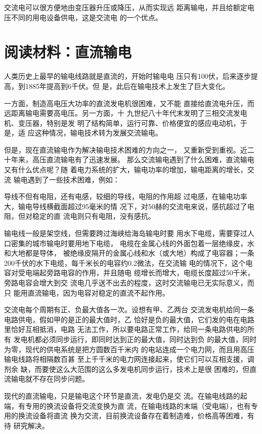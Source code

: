 交流电可以很方便地由变压器升压或降压，从而实现远
距离输电，并且给额定电压不同的用电设备供电，这是交流电
的一个优点。

\section*{阅读材料：直流输电}
人类历史上最早的输电线路就是直流的，开始时输电电
压只有100伏，后来逐步提高，到1885年提高到6千伏。但
是，此后在输电技术上发生了巨大变化。

一方面，制造高电压大功率的直流发电机很困难，又不能
直接给直流电升压，而远距离输电需要高电压。另一方面，十
九世纪八十年代末发明了三相交流发电机、变压器，特别是发
明了结构简单，运行可靠、价格便宜的感应电动机，于是，适
应这种情况，输电技术转为发展交流输电。

但是，现在直流输电作为解决输电技术困难的方向之一，
又重新受到重视。近二十年来，高压直流输电有了迅速发展。
那么交流输电遇到了什么困难，直流输电又有什么优点呢？随
着电力系统的扩大，输电功率的增加，输电距离的增长，交流
输电遇到了一些技术困难，例如：

导线不但有电阻，还有电感，较细的导线，电阻的作用超
过电感，在输电功率大，输电导线横截面超过95毫米的情
况下，对50赫的交流电来说，感抗超过了电阻，但对稳定的直
流电则只有电阻，没有感抗。

输电线一般是架空线，但需要跨过海峡给海岛输电时要
用水下电缆，需要穿过人口密集的城市输电时要用地下电缆，
电缆在金属心线的外面包着一层绝缘皮，水和大地都是导体，
被绝缘皮隔开的金属心线和水（或大地）构成了电容器；一条
200千伏的水下电缆，每千米长的电容约0.2微法，在交流输
电的情况下，这个电容对受电端起旁路电容的作用，并且随电
缆增长而增大，电缆长度超过50千米，旁路电容会增大到交
流电几乎送不出去的程度，这时交流输电已无实际意义，而只
能用直流输电，因为电容对稳定的直流不起作用。

交流电每个周期有正、负最大值各一次。设想有甲、乙两台
交流发电机给同一条电路供电，假如甲的是正的最大值时，乙
恰好是负的最大值，它们发的电在电路里恰好互相抵消，电路
无法工作，所以要电路正常工作，给同一条电路供电的所有
发电机都必须同步运行，即同时达到正的最大值，同时达到负
的最大值，同时为零，现代的供电系统是把方圆数百千米内
的电站连成一个电力网，而且用高压输电线路将相隔数百甚
至上千千米的电力网连接起来，使它们可以互相支援，调剂余
缺，而要使这么大范围的这么多发电机同步运行，技术上是很
困难的，但直流输电就不存在同步问题。

现代的直流输电，只是输电这个环节是直流，发电仍是交
流。在输电线路的起端，有专用的换流设备将交流变换为直
流，在输电线路的末端（受电端），也有专用的换流设备将直流
换为交流，目前换流设备存在着制造难，价格高等困难，有待
研究解决。

